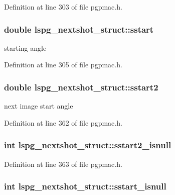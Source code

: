 Definition at line 303 of file pgpmac.\-h.

\hypertarget{structlspg__nextshot__struct_a8dc11eaa094d59f61642c4abc226918f}{
\subsubsection[{sstart}]{\setlength{\rightskip}{0pt plus 5cm}double lspg\-\_\-nextshot\-\_\-struct\-::sstart}}\label{structlspg__nextshot__struct_a8dc11eaa094d59f61642c4abc226918f}


starting angle 



Definition at line 305 of file pgpmac.\-h.

\hypertarget{structlspg__nextshot__struct_a8445cbd2206dc6d62b6bd433f5218c98}{
\subsubsection[{sstart2}]{\setlength{\rightskip}{0pt plus 5cm}double lspg\-\_\-nextshot\-\_\-struct\-::sstart2}}\label{structlspg__nextshot__struct_a8445cbd2206dc6d62b6bd433f5218c98}


next image start angle 



Definition at line 362 of file pgpmac.\-h.

\hypertarget{structlspg__nextshot__struct_a240c8532d5ce48dbc872d5123a4e721c}{
\subsubsection[{sstart2\-\_\-isnull}]{\setlength{\rightskip}{0pt plus 5cm}int lspg\-\_\-nextshot\-\_\-struct\-::sstart2\-\_\-isnull}}\label{structlspg__nextshot__struct_a240c8532d5ce48dbc872d5123a4e721c}


Definition at line 363 of file pgpmac.\-h.

\hypertarget{structlspg__nextshot__struct_aa53094de91e2f69d7174ab119df1cdac}{
\subsubsection[{sstart\-\_\-isnull}]{\setlength{\rightskip}{0pt plus 5cm}int lspg\-\_\-nextshot\-\_\-struct\-::sstart\-\_\-isnull}}\label{structlspg__nextshot__struct_aa53094de91e2f69d7174ab119df1cdac}


